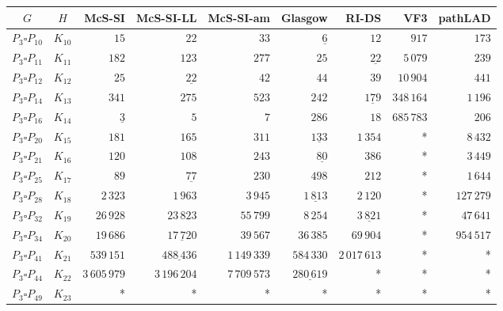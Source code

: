 
\begin{tabular}{ccrrrrrrr}
    \toprule
    {$G$} & {$H$} & {McS-SI} & {McS-SI-LL} & {McS-SI-am} & Glasgow & RI-DS & VF3 & pathLAD \\ 
    \midrule

$P_3\square P_{10}$ & $K_{10}$ & $15$ & $22$ & $33$ & $\underline{6}$ & $12$ & $917$ & $173$\\
$P_3\square P_{11}$ & $K_{11}$ & $182$ & $123$ & $277$ & $25$ & $\underline{22}$ & $5\,079$ & $239$\\
$P_3\square P_{12}$ & $K_{12}$ & $25$ & $\underline{22}$ & $42$ & $44$ & $39$ & $10\,904$ & $441$\\
$P_3\square P_{14}$ & $K_{13}$ & $341$ & $275$ & $523$ & $242$ & $\underline{179}$ & $348\,164$ & $1\,196$\\
$P_3\square P_{16}$ & $K_{14}$ & $\underline{3}$ & $5$ & $7$ & $286$ & $18$ & $685\,783$ & $206$\\
$P_3\square P_{20}$ & $K_{15}$ & $181$ & $165$ & $311$ & $\underline{133}$ & $1\,354$ & * & $8\,432$\\
$P_3\square P_{21}$ & $K_{16}$ & $120$ & $108$ & $243$ & $\underline{80}$ & $386$ & * & $3\,449$\\
$P_3\square P_{25}$ & $K_{17}$ & $89$ & $\underline{77}$ & $230$ & $498$ & $212$ & * & $1\,644$\\
$P_3\square P_{28}$ & $K_{18}$ & $2\,323$ & $1\,963$ & $3\,945$ & $\underline{1\,813}$ & $2\,120$ & * & $127\,279$\\
$P_3\square P_{32}$ & $K_{19}$ & $26\,928$ & $23\,823$ & $55\,799$ & $8\,254$ & $\underline{3\,821}$ & * & $47\,641$\\
$P_3\square P_{34}$ & $K_{20}$ & $19\,686$ & $\underline{17\,720}$ & $39\,567$ & $36\,385$ & $69\,904$ & * & $954\,517$\\
$P_3\square P_{41}$ & $K_{21}$ & $539\,151$ & $\underline{488\,436}$ & $1\,149\,339$ & $584\,330$ & $2\,017\,613$ & * & *\\
$P_3\square P_{44}$ & $K_{22}$ & $3\,605\,979$ & $3\,196\,204$ & $7\,709\,573$ & $\underline{280\,619}$ & * & * & *\\
$P_3\square P_{49}$ & $K_{23}$ & * & * & * & * & * & * & *\\

    \bottomrule
\end{tabular}

